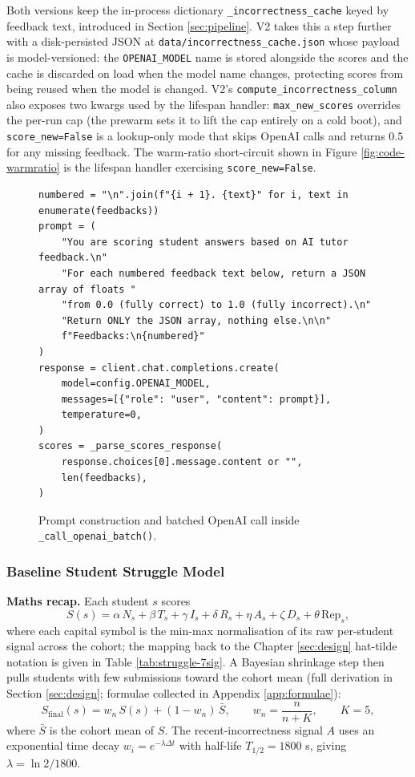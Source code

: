 Both versions keep the in-process dictionary \texttt{\_incorrectness\_cache} keyed by feedback text, introduced in Section \ref{sec:pipeline}.
V2 takes this a step further with a disk-persisted JSON at \texttt{data/incorrectness\_cache.json} whose payload is model-versioned: the \texttt{OPENAI\_MODEL} name is stored alongside the scores and the cache is discarded on load when the model name changes, protecting scores from being reused when the model is changed.
V2's \texttt{compute\_incorrectness\_column} also exposes two kwargs used by the lifespan handler: \texttt{max\_new\_scores} overrides the per-run cap (the prewarm sets it to lift the cap entirely on a cold boot), and \texttt{score\_new=False} is a lookup-only mode that skips OpenAI calls and returns $0.5$ for any missing feedback. The warm-ratio short-circuit shown in Figure \ref{fig:code-warmratio} is the lifespan handler exercising \texttt{score\_new=False}.

\begin{figure}[H]
    \centering
    \begin{minipage}{0.92\linewidth}
\begin{lstlisting}[firstnumber=82]
numbered = "\n".join(f"{i + 1}. {text}" for i, text in enumerate(feedbacks))
prompt = (
    "You are scoring student answers based on AI tutor feedback.\n"
    "For each numbered feedback text below, return a JSON array of floats "
    "from 0.0 (fully correct) to 1.0 (fully incorrect).\n"
    "Return ONLY the JSON array, nothing else.\n\n"
    f"Feedbacks:\n{numbered}"
)
response = client.chat.completions.create(
    model=config.OPENAI_MODEL,
    messages=[{"role": "user", "content": prompt}],
    temperature=0,
)
scores = _parse_scores_response(
    response.choices[0].message.content or "",
    len(feedbacks),
)
\end{lstlisting}
    \end{minipage}
    \caption{Prompt construction and batched OpenAI call inside \texttt{\_call\_openai\_batch()}.}
    \label{fig:code-openai}
\end{figure}


\subsubsection{Baseline Student Struggle Model}

\textbf{Maths recap.}
Each student $s$ scores
\[
S(s)
= \alpha\, N_s
+ \beta\, T_s
+ \gamma\, I_s
+ \delta\, R_s
+ \eta\, A_s
+ \zeta\, D_s
+ \theta\, \mathrm{Rep}_s,
\]
where each capital symbol is the min-max normalisation of its raw per-student signal across the cohort; the mapping back to the Chapter \ref{sec:design} hat-tilde notation is given in Table \ref{tab:struggle-7sig}.
A Bayesian shrinkage step then pulls students with few submissions toward the cohort mean (full derivation in Section \ref{sec:design}; formulae collected in Appendix \ref{app:formulae}):
\[
S_{\mathrm{final}}(s) = w_n\, S(s) + (1 - w_n)\,\bar{S}, \qquad w_n = \frac{n}{n + K}, \qquad K = 5,
\]
where $\bar{S}$ is the cohort mean of $S$.
The recent-incorrectness signal $A$ uses an exponential time decay $w_i = e^{-\lambda \Delta t}$ with half-life $T_{1/2} = 1800$ s, giving $\lambda = \ln 2 / 1800$.

